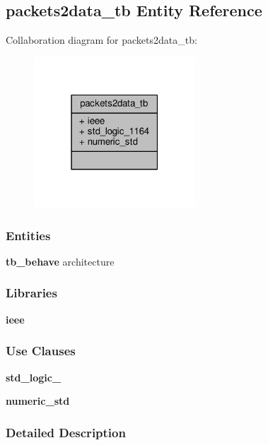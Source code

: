 \subsection{packets2data\+\_\+tb Entity Reference}
\label{classpackets2data__tb}


Collaboration diagram for packets2data\+\_\+tb\+:\nopagebreak
\begin{figure}[H]
\begin{center}
\leavevmode
\includegraphics[width=171pt]{da/da6/classpackets2data__tb__coll__graph}
\end{center}
\end{figure}
\subsubsection*{Entities}
\begin{DoxyCompactItemize}
\item 
{\bf tb\+\_\+behave} architecture
\end{DoxyCompactItemize}
\subsubsection*{Libraries}
 \begin{DoxyCompactItemize}
\item 
{\bf ieee} 
\end{DoxyCompactItemize}
\subsubsection*{Use Clauses}
 \begin{DoxyCompactItemize}
\item 
{\bf std\+\_\+logic\+\_}   
\item 
{\bf numeric\+\_\+std}   
\end{DoxyCompactItemize}


\subsubsection{Detailed Description}


